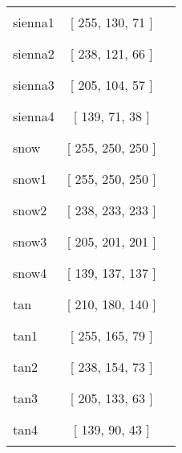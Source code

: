 \begin{tabular}{|l|c|c|}
sienna1 & [ 255, 130, 71 ] & \color{sienna1} \rule{1cm}{1.5ex}\\
sienna2 & [ 238, 121, 66 ] & \color{sienna2} \rule{1cm}{1.5ex}\\
sienna3 & [ 205, 104, 57 ] & \color{sienna3} \rule{1cm}{1.5ex}\\
sienna4 & [ 139, 71, 38 ] & \color{sienna4} \rule{1cm}{1.5ex}\\
snow & [ 255, 250, 250 ] & \color{snow} \rule{1cm}{1.5ex}\\
snow1 & [ 255, 250, 250 ] & \color{snow1} \rule{1cm}{1.5ex}\\
snow2 & [ 238, 233, 233 ] & \color{snow2} \rule{1cm}{1.5ex}\\
snow3 & [ 205, 201, 201 ] & \color{snow3} \rule{1cm}{1.5ex}\\
snow4 & [ 139, 137, 137 ] & \color{snow4} \rule{1cm}{1.5ex}\\
tan & [ 210, 180, 140 ] & \color{tan} \rule{1cm}{1.5ex}\\
tan1 & [ 255, 165, 79 ] & \color{tan1} \rule{1cm}{1.5ex}\\
tan2 & [ 238, 154, 73 ] & \color{tan2} \rule{1cm}{1.5ex}\\
tan3 & [ 205, 133, 63 ] & \color{tan3} \rule{1cm}{1.5ex}\\
tan4 & [ 139, 90, 43 ] & \color{tan4} \rule{1cm}{1.5ex}\\
\end{tabular}


